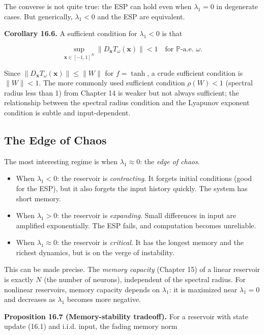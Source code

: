 The converse is not quite true: the ESP can hold even when $\lambda_1 = 0$ in degenerate cases. But generically, $\lambda_1 < 0$ and the ESP are equivalent.

\textbf{Corollary 16.6.} A sufficient condition for $\lambda_1 < 0$ is that

\[
\sup_{\mathbf{x} \in [-1,1]^N} \|D_\mathbf{x} T_\omega(\mathbf{x})\| < 1 \quad \text{for } \mathbb{P}\text{-a.e. } \omega.
\]

Since $\|D_\mathbf{x} T_\omega(\mathbf{x})\| \leq \|W\|$ for $f = \tanh$, a crude sufficient condition is $\|W\| < 1$. The more commonly used sufficient condition $\rho(W) < 1$ (spectral radius less than 1) from Chapter 14 is weaker but not always sufficient; the relationship between the spectral radius condition and the Lyapunov exponent condition is subtle and input-dependent.

\subsection{The Edge of Chaos}\label{sec:16.3.3}

The most interesting regime is when $\lambda_1 \approx 0$: the \textit{edge of chaos}.

\begin{itemize}[nosep]
  \item When $\lambda_1 < 0$: the reservoir is \textit{contracting}. It forgets initial conditions (good for the ESP), but it also forgets the input history quickly. The system has short memory.
  \item When $\lambda_1 > 0$: the reservoir is \textit{expanding}. Small differences in input are amplified exponentially. The ESP fails, and computation becomes unreliable.
  \item When $\lambda_1 \approx 0$: the reservoir is \textit{critical}. It has the longest memory and the richest dynamics, but is on the verge of instability.
\end{itemize}

This can be made precise. The \textit{memory capacity} (Chapter 15) of a linear reservoir is exactly $N$ (the number of neurons), independent of the spectral radius. For nonlinear reservoirs, memory capacity depends on $\lambda_1$: it is maximized near $\lambda_1 = 0$ and decreases as $\lambda_1$ becomes more negative.

\textbf{Proposition 16.7 (Memory-stability tradeoff).} For a reservoir with state update (16.1) and i.i.d. input, the fading memory norm

